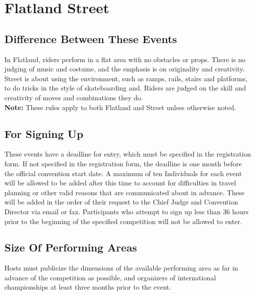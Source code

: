 \chapter{Flatland Street}

\section{Difference Between These Events}
In Flatland, riders perform in a flat area with no obstacles or props. There is no judging of music and costume, and the
emphasis is on originality and creativity. Street is about using the environment, such as ramps, rails, stairs and platforms,
to do tricks in the style of skateboarding and. Riders are judged on the skill and creativity of moves and combinations they
do.\\
\textbf{Note:} These rules apply to both Flatland and Street unless otherwise noted.

\section{For Signing Up}
These events have a deadline for entry, which must be specified in the registration form. If not specified in the registration
form, the deadline is one month before the official convention start date. A maximum of ten Individuals for each event will
be allowed to be added after this time to account for difficulties in travel planning or other valid reasons that are communicated about in advance. These will be added in the order of their request to the Chief Judge and Convention Director via email or fax. Participants who attempt to sign up less than 36 hours prior to the beginning of the specified competition will not be allowed to enter.

\section{Size Of Performing Areas }
Hosts must publicize the dimensions of the available performing area as far in advance of the competition as possible, and
organizers of international championships at least three months prior to the event.

